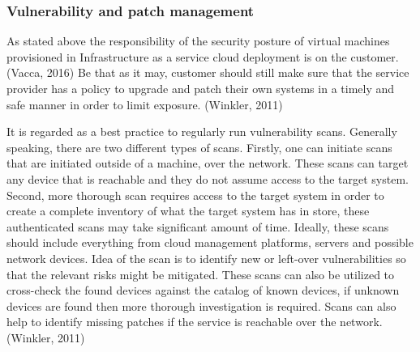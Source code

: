 \documentclass{article}
\begin{document}
\subsubsection{Vulnerability and patch management}
As stated above the responsibility of the security posture of virtual machines provisioned in Infrastructure as a service cloud deployment is on the customer.(Vacca, 2016) Be that as it may, customer should still make sure that the service provider has a policy to upgrade and patch their own systems in a timely and safe manner in order to limit exposure. (Winkler, 2011)
\par
It is regarded as a best practice to regularly run vulnerability scans. Generally speaking, there are two different types of scans. Firstly, one can initiate scans that are initiated outside of a machine, over the network. These scans can target any device that is reachable and they do not assume access to the target system. Second, more thorough scan requires access to the target system in order to create a complete inventory of what the target system has in store, these authenticated scans may take significant amount of time. Ideally, these scans should include everything from cloud management platforms, servers and possible network devices. Idea of the scan is to identify new or left-over vulnerabilities so that the relevant risks might be mitigated. These scans can also be utilized to cross-check the found devices against the catalog of known devices, if unknown devices are found then more thorough investigation is required. Scans can also help to identify missing patches if the service is reachable over the network.(Winkler, 2011)
\end{document}
